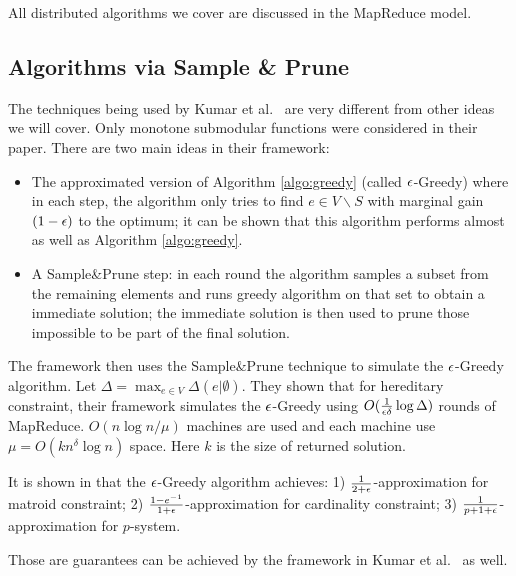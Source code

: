 All distributed algorithms we cover are discussed in the MapReduce model.

\subsection{Algorithms via Sample \& Prune}
The techniques being used by Kumar et al.\ \cite{KMV+15} are very different from other ideas we will cover. Only monotone submodular functions were considered in their paper. There are two main ideas in their framework:
\begin{itemize}
\item The approximated version of Algorithm \ref{algo:greedy} (called {\sc $\epsilon$-Greedy}) where in each step, the algorithm only tries to find $e\in V\backslash S$ with marginal gain $(1 - \epsilon)$ to the optimum; it can be shown that this algorithm performs almost as well as Algorithm \ref{algo:greedy}.
\item A Sample\&Prune step: in each round the algorithm samples a subset from the remaining elements and runs greedy algorithm on that set to obtain a immediate solution;  the immediate solution is then used to prune those impossible to be part of the final solution.
\end{itemize}

The framework then uses the Sample\&Prune technique to simulate the {\sc $\epsilon$-Greedy} algorithm. Let $\Delta = \max_{e\in V} \Delta(e|\emptyset)$. They shown that for hereditary constraint, their framework simulates the {\sc $\epsilon$-Greedy} using $O(\frac{1}{\epsilon \delta}\log \Delta)$ rounds of MapReduce. $O(n\log n / \mu)$ machines are used and each machine use $\mu = O(k n^{\delta}\log n)$ space. Here $k$ is the size of returned solution.

It is shown in \cite{CCP+11} that the {\sc $\epsilon$-Greedy} algorithm achieves: 1)  $\frac{1}{2+\epsilon}$-approximation for matroid constraint; 2) $\frac{1 - e^{-1}}{1 + \epsilon}$-approximation for cardinality constraint; 3) $\frac{1}{p + 1 + \epsilon}$-approximation for $p$-system.

Those are guarantees can be achieved by the framework in Kumar et al.\ \cite{KMV+15} as well.



